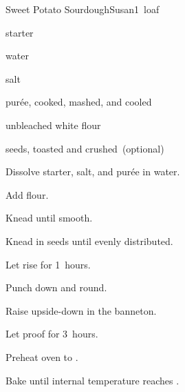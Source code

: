 \begin{recipe}{Sweet Potato Sourdough}{Susan}{1~loaf}

\begin{ingredients}
\item {} starter
\item {} water
\item {} salt
\item {}  purée, cooked, mashed, and cooled
\item {} unbleached white flour
\item {}  seeds, toasted and crushed~(optional)
\end{ingredients}

\begin{directions}
\item Dissolve starter, salt, and purée in water.
\item Add flour.
\item Knead until smooth.
\item Knead in seeds until evenly distributed.
\item Let rise for 1\half{}~hours.
\item Punch down and round.
\item Raise upside-down in the banneton.
\item Let proof for 3~hours.
\item Preheat oven to .
\item Bake until internal temperature reaches .
\end{directions}

\end{recipe}

